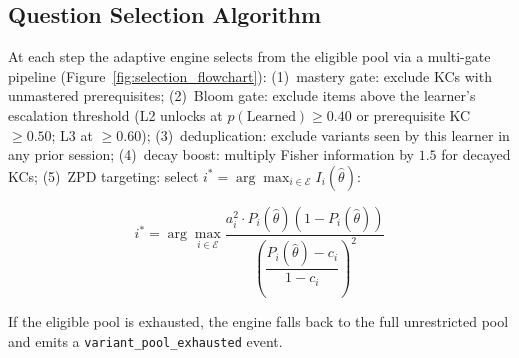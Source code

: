 \subsection{Question Selection Algorithm}
\label{subsec:meth_selection}

At each step the adaptive engine selects from the eligible pool via a
multi-gate pipeline (Figure~\ref{fig:selection_flowchart}):
(1)~mastery gate: exclude KCs with unmastered prerequisites;
(2)~Bloom gate: exclude items above the learner's escalation threshold
(L2 unlocks at $p(\text{Learned}) \geq 0.40$ or prerequisite KC $\geq 0.50$;
L3 at $\geq 0.60$);
(3)~deduplication: exclude variants seen by this learner in any prior session;
(4)~decay boost: multiply Fisher information by $1.5$ for decayed KCs;
(5)~ZPD targeting: select $i^* = \arg\max_{i \in \mathcal{E}} I_i(\hat{\theta})$:

\begin{equation}
  i^* = \arg\max_{i \in \mathcal{E}}
    \frac{a_i^2 \cdot P_i(\hat{\theta})(1 - P_i(\hat{\theta}))}
    {\left(\dfrac{P_i(\hat{\theta}) - c_i}{1 - c_i}\right)^2}
  \label{eq:selection}
\end{equation}

If the eligible pool is exhausted, the engine falls back to the full
unrestricted pool and emits a \texttt{variant\_pool\_exhausted} event.

